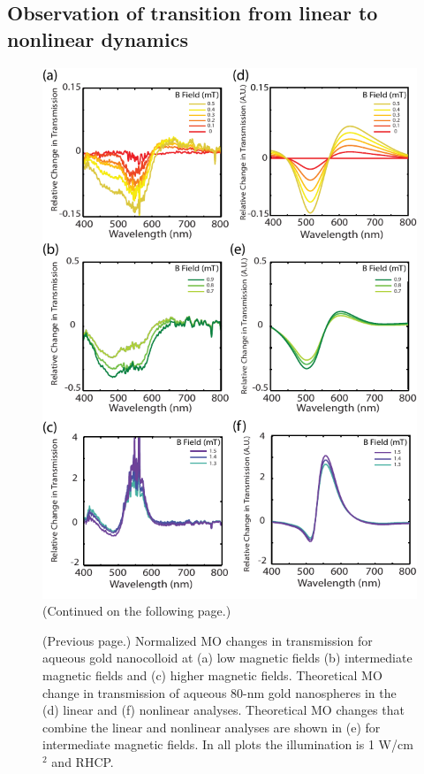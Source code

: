 \subsection{Observation of transition from linear to nonlinear dynamics}
\begin{figure}[p]
\centering
\includegraphics[height=0.95\textheight]{ExExpB11.pdf}
\caption{(Continued on the following page.)}
\label{Exp}
\end{figure}
\addtocounter{figure}{-1}
\begin{figure} [t!]
  \caption{(Previous page.) Normalized MO changes in transmission for aqueous gold nanocolloid at (a) low magnetic fields (b) intermediate magnetic fields and (c) higher magnetic fields. Theoretical MO change in transmission of aqueous 80-nm gold nanospheres in the (d) linear and (f) nonlinear analyses. Theoretical MO changes that combine the linear and nonlinear analyses are shown in (e) for intermediate magnetic fields. In all plots the illumination is 1 W/cm$^2$ and RHCP.}%
\end{figure}

